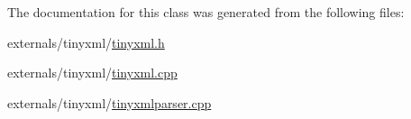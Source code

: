The documentation for this class was generated from the following files\-:\begin{DoxyCompactItemize}
\item 
externals/tinyxml/\hyperlink{tinyxml_8h}{tinyxml.\-h}\item 
externals/tinyxml/\hyperlink{tinyxml_8cpp}{tinyxml.\-cpp}\item 
externals/tinyxml/\hyperlink{tinyxmlparser_8cpp}{tinyxmlparser.\-cpp}\end{DoxyCompactItemize}

